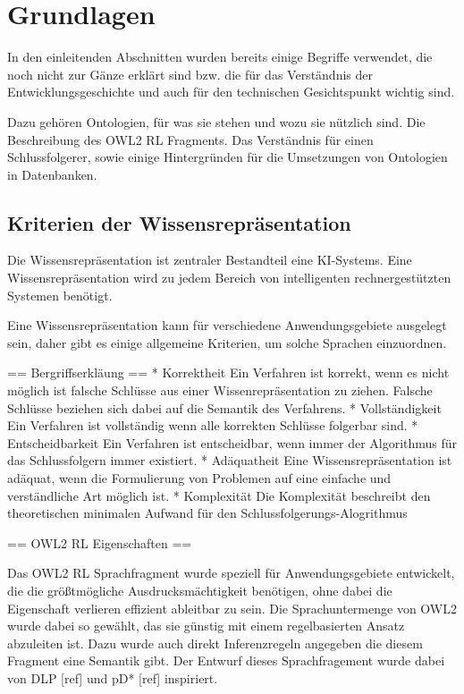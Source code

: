 \chapter{Grundlagen}
In den einleitenden Abschnitten wurden bereits einige Begriffe verwendet, die noch nicht zur Gänze erklärt sind bzw. die für das Verständnis der Entwicklungsgeschichte und auch für den technischen Gesichtspunkt wichtig sind.

Dazu gehören Ontologien, für was sie stehen und wozu sie nützlich sind. Die Beschreibung des OWL2 RL Fragments. Das Verständnis für einen Schlussfolgerer, sowie einige Hintergründen für die Umsetzungen von Ontologien in Datenbanken.

\section{Kriterien der Wissensrepräsentation}

Die Wissensrepräsentation ist zentraler Bestandteil eine KI-Systems. Eine Wissensrepräsentation wird zu jedem Bereich von intelligenten rechnergestützten Systemen benötigt.

Eine Wissensrepräsentation kann für verschiedene Anwendungsgebiete ausgelegt sein, daher gibt es einige allgemeine Kriterien, um solche Sprachen einzuordnen.

== Bergriffserkläung ==
 * Korrektheit
Ein Verfahren ist korrekt, wenn es nicht möglich ist falsche Schlüsse aus einer Wissenrepräsentation zu ziehen. Falsche Schlüsse beziehen sich dabei auf die Semantik des Verfahrens.
 * Vollständigkeit
Ein Verfahren ist vollständig wenn alle korrekten Schlüsse folgerbar sind.
 * Entscheidbarkeit
Ein Verfahren ist entscheidbar, wenn immer der Algorithmus für das Schlussfolgern immer existiert.
 * Adäquatheit
Eine Wissensrepräsentation ist adäquat, wenn die Formulierung von Problemen auf eine einfache und verständliche Art möglich ist.
 * Komplexität
Die Komplexität beschreibt den theoretischen minimalen Aufwand für den Schlussfolgerungs-Alogrithmus


== OWL2 RL Eigenschaften ==

Das OWL2 RL Sprachfragment wurde speziell für Anwendungsgebiete entwickelt, die die größtmögliche Ausdrucksmächtigkeit benötigen, ohne dabei die Eigenschaft verlieren effizient ableitbar zu sein. Die Sprachuntermenge von OWL2 wurde dabei so gewählt, das sie günstig mit einem regelbasierten Ansatz abzuleiten ist. Dazu wurde auch direkt Inferenzregeln angegeben die diesem Fragment eine Semantik gibt. Der Entwurf dieses Sprachfragement wurde dabei von DLP [ref] und pD* [ref] inspiriert.

